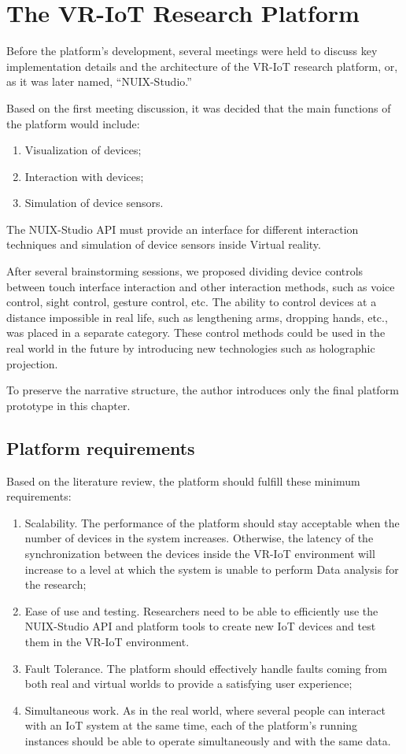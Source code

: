 
\chapter{The VR-IoT Research Platform}

Before the platform's development, several meetings were held to discuss key implementation details and the architecture of the VR-IoT research platform, or, as it was later named, ``NUIX-Studio.''

Based on the first meeting discussion, it was decided that the main functions of the platform would include:
\begin{enumerate}
     \item Visualization of devices;
     \item Interaction with devices;
     \item Simulation of device sensors.
\end{enumerate}

The NUIX-Studio API must provide an interface for different interaction techniques and simulation of device sensors inside Virtual reality.

After several brainstorming sessions, we proposed dividing device controls between touch interface interaction and other interaction methods, such as voice control, sight control, gesture control, etc. The ability to control devices at a distance impossible in real life, such as lengthening arms, dropping hands, etc., was placed in a separate category. These control methods could be used in the real world in the future by introducing new technologies such as holographic projection.

To preserve the narrative structure, the author introduces only the final platform prototype in this chapter.

\section{Platform requirements}
Based on the literature review, the platform should fulfill these minimum requirements:
\begin{enumerate}
\item Scalability. The performance of the platform should stay acceptable when the number of devices in the system increases. Otherwise, the latency of the synchronization between the devices inside the VR-IoT environment will increase to a level at which the system is unable to perform Data analysis for the research;
\item Ease of use and testing. Researchers need to be able to efficiently use the NUIX-Studio API and platform tools to create new IoT devices and test them in the VR-IoT environment.
\item Fault Tolerance. The platform should effectively handle faults coming from both real and virtual worlds to provide a satisfying user experience;
\item Simultaneous work. As in the real world, where several people can interact with an IoT system at the same time, each of the platform's running instances should be able to operate simultaneously and with the same data.
\end{enumerate}

